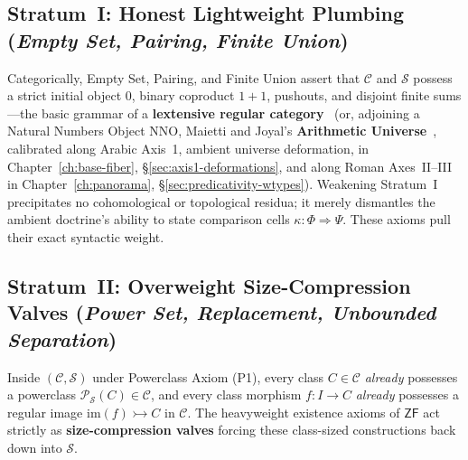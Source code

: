\subsection{Stratum~I: Honest Lightweight Plumbing (\emph{Empty Set, Pairing, Finite Union})}\label{subsec:ast-stratum-i}

Categorically, Empty Set, Pairing, and Finite Union assert that $\mathcal{C}$ and $\mathcal{S}$ possess a strict initial object $0$, binary coproduct $1 + 1$, pushouts, and disjoint finite sums---the basic grammar of a \textbf{lextensive regular category}~\cite[Ch.~I]{JoyalMoerdijk95} (or, adjoining a Natural Numbers Object $\mathrm{NNO}$, Maietti and Joyal's \textbf{Arithmetic Universe}~\cite{Maietti05}, calibrated along Arabic Axis~1, ambient universe deformation, in Chapter~\ref{ch:base-fiber}, \S\ref{sec:axis1-deformations}, and along Roman Axes~II--III in Chapter~\ref{ch:panorama}, \S\ref{sec:predicativity-wtypes}). Weakening Stratum~I precipitates no cohomological or topological residua; it merely dismantles the ambient doctrine's ability to state comparison cells $\kappa : \Phi \Rightarrow \Psi$. These axioms pull their exact syntactic weight.

\subsection{Stratum~II: Overweight Size-Compression Valves (\emph{Power Set, Replacement, Unbounded Separation})}\label{subsec:ast-stratum-ii}

Inside $(\mathcal{C}, \mathcal{S})$ under Powerclass Axiom (P1), every class $C \in \mathcal{C}$ \emph{already} possesses a powerclass $\mathcal{P}_{\mathcal{S}}(C) \in \mathcal{C}$, and every class morphism $f : I \to C$ \emph{already} possesses a regular image $\mathrm{im}(f) \rightarrowtail C$ in $\mathcal{C}$. The heavyweight existence axioms of $\mathsf{ZF}$ act strictly as \textbf{size-compression valves} forcing these class-sized constructions back down into $\mathcal{S}$.


